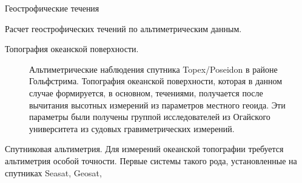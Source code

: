 \begin{chapter}{Геострофические течения}
\begin{section}{Расчет геострофических течений по альтиметрическим данным.}
\begin{paragraph}{Топография океанской поверхности.}
\begin{figure}[t!]
\caption{Альтиметрические наблюдения спутника Topex/Poseidon в районе
Гольфстрима. Топография океанской поверхности, которая в данном случае
формируется, в основном, течениями, получается после вычитания
высотных измерений из параметров местного геоида. Эти параметры были
получены группой исследователей из Огайского университета из судовых
гравиметрических измерений.}
\label{sshprofile}
\end{figure}
%
\end{paragraph}

\begin{paragraph}{Спутниковая альтиметрия.}
Для измерений океанской топографии требуется альтиметрия особой
точности. Первые системы такого рода, установленные на спутниках
Seasat, Geosat,


\end{paragraph}
\end{section}
\end{chapter}
